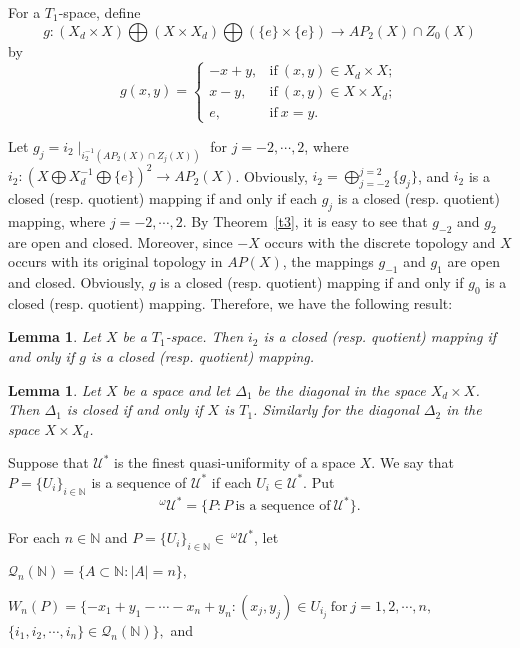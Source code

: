 \documentclass{amsart}
\newtheorem{lemma}[theorem]{Lemma}
\theoremstyle{definition}
\begin{document}
For a $T_{1}$-space, define $$g: (X_{d}\times X)\bigoplus (X\times X_{d})\bigoplus (\{e\}\times\{e\})\longrightarrow AP_{2}(X)\cap Z_{0}(X)$$by
\[g(x, y)=\left\{
\begin{array}{lll}
-x+y, & \mbox{if}\ (x, y)\in X_{d}\times X;\\
x-y, & \mbox{if}\ (x, y)\in X\times X_{d};\\
e, & \mbox{if}\ x=y.\end{array}\right.\]

Let $g_{j}=i_{2}\mid _{i_{2}^{-1}(AP_{2}(X)\cap Z_{j}(X))}$ for $j=-2, \cdots, 2$, where $i_{2}: (X\bigoplus X_{d}^{-1}\bigoplus\{e\})^{2}\longrightarrow AP_{2}(X)$. Obviously, $i_{2}=\bigoplus_{j=-2}^{j=2}\{g_{j}\}$, and $i_{2}$ is a closed (resp. quotient) mapping if and only if each $g_{j}$ is a closed (resp. quotient) mapping, where  $j=-2, \cdots, 2$. By Theorem~\ref{t3}, it is easy to see that $g_{-2}$ and $g_{2}$ are open and closed. Moreover, since $-X$ occurs with the discrete topology and $X$ occurs with its original topology in $AP(X)$, the mappings $g_{-1}$ and $g_{1}$ are open and closed. Obviously, $g$ is a closed (resp. quotient) mapping if and only if $g_{0}$ is a closed (resp. quotient) mapping. Therefore, we have the following result:

\begin{lemma}\label{l0}
Let $X$ be a $T_{1}$-space. Then $i_{2}$ is a closed (resp. quotient) mapping if and only if $g$ is a closed (resp. quotient) mapping.
\end{lemma}

\begin{lemma}\label{l1}\cite{EN2013}
Let $X$ be a space and let $\Delta_{1}$ be the diagonal in the space $X_{d}\times X$. Then $\Delta_{1}$ is closed if and only if $X$ is $T_{1}$. Similarly for the diagonal $\Delta_{2}$ in the space $X\times X_{d}$.
\end{lemma}

Suppose that $\mathscr{U}^{\ast}$ is the finest quasi-uniformity of a space $X$. We say that $P=\{U_{i}\}_{i\in\mathbb{N}}$ is a sequence of $\mathscr{U}^{\ast}$ if each $U_{i}\in \mathscr{U}^{\ast}$. Put $$^{\omega}\mathscr{U}^{\ast}=\{P: P\ \mbox{is a sequence of}\ \mathscr{U}^{\ast}\}.$$

For each $n\in\mathbb{N}$ and $P=\{U_{i}\}_{i\in\mathbb{N}}\in\ ^{\omega}\mathscr{U}^{\ast}$, let

$\mathscr{Q}_{n}(\mathbb{N})=\{A\subset \mathbb{N}: |A|=n\},$

$W_{n}(P)=\{-x_{1}+y_{1}-\cdots -x_{n}+y_{n}: (x_{j}, y_{j})\in U_{i_{j}}\ \mbox{for}\ j=1, 2, \cdots, n,$ $\{i_{1}, i_{2}, \cdots, i_{n}\}\in \mathscr{Q}_{n}(\mathbb{N})\},$ and
\end{document}
